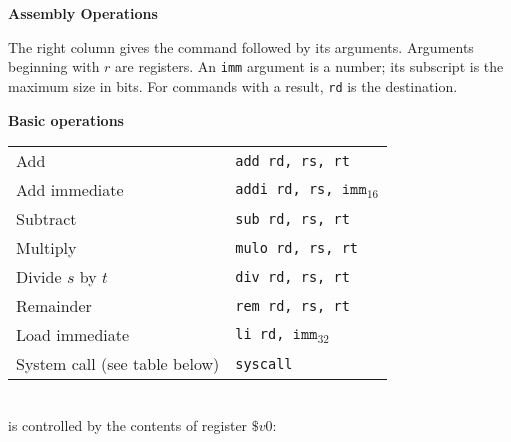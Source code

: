 \documentclass{article}
\newcommand{\pseudo}{{\ensuremath\ast}}
\begin{document}
\begin{center}
  \bf\LARGE Assembly Operations
\end{center}

The right column gives the command followed by its arguments.
Arguments beginning with $r$ are registers.
An {\tt imm} argument is a number; its subscript
is the maximum size in bits.
For commands with a result, {\tt rd} is the
destination.

\vspace{1em}
\noindent
\textbf{Basic operations}
\begin{center}
\begin{tabular}{ll}
Add & {\tt add rd, rs, rt} \\
Add immediate & {\tt addi rd, rs, }$\mathtt{imm}_{16}$ \\
Subtract & {\tt sub rd, rs, rt} \\
Multiply\pseudo & {\tt mulo rd, rs, rt} \\
Divide $s$ by $t$\pseudo & {\tt div rd, rs, rt} \\
Remainder\pseudo & {\tt rem rd, rs, rt} \\
Load immediate\pseudo & {\tt li rd, }$\mathtt{imm}_{32}$ \\
System call (see table below) & {\tt syscall} \\
\end{tabular} \\
\hspace*{2em}{\tt syscall} is controlled by the contents of register $\$v0$: \\

\end{center}
\end{document}
